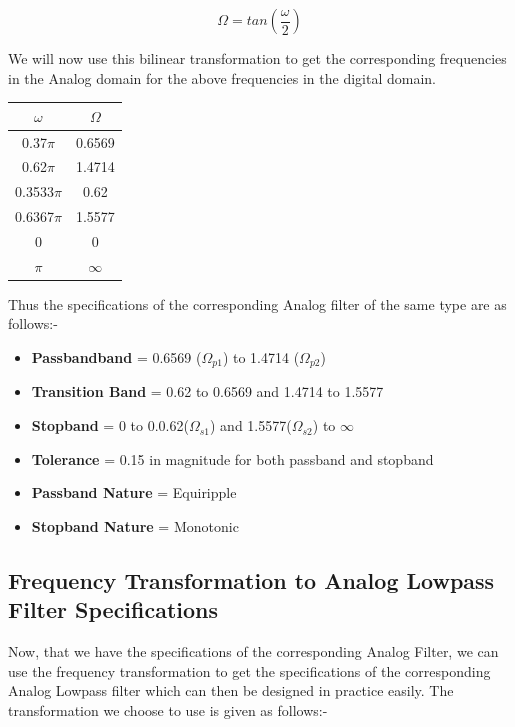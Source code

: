 \documentclass[12pt]{article}
\begin{document}
\[\Omega = tan(\frac{\omega}{2})\]

\noindent
We will now use this bilinear transformation to get the corresponding frequencies in the Analog domain for the above frequencies in the digital domain.

\begin{center}
    \begin{tabular}{|c|c|}
     \hline
    $\omega$ & $\Omega$ \\ \hline
    0.37$\pi$ & 0.6569 \\ \hline
    0.62$\pi$ & 1.4714 \\ \hline
    0.3533$\pi$ & 0.62 \\ \hline
    0.6367$\pi$ & 1.5577 \\ \hline
    0 & 0 \\ \hline
    $\pi$ & $\infty$ \\ \hline
    \end{tabular}
\end{center}
\newpage

\noindent

Thus the specifications of the corresponding Analog filter of the same type are as follows:-

\begin{itemize}
    \item \textbf{Passbandband} = 0.6569 ($\Omega_{p1}$) to 1.4714 ($\Omega_{p2}$)
    \item \textbf{Transition Band} = 0.62 to 0.6569 and 1.4714 to 1.5577
    \item \textbf{Stopband} = 0 to 0.0.62($\Omega_{s1}$) and 1.5577($\Omega_{s2}$) to $\infty$
    \item\textbf{Tolerance} = 0.15 in magnitude for both passband and stopband
    \item \textbf{Passband Nature} = Equiripple
    \item \textbf{Stopband Nature} = Monotonic
\end{itemize}

\subsection{Frequency Transformation to Analog Lowpass Filter Specifications}

Now, that we have the specifications of the corresponding Analog Filter, we can use the frequency transformation to get the specifications of the corresponding Analog Lowpass filter which can then be designed in practice easily. The transformation we choose to use is given as follows:-
\end{document}
